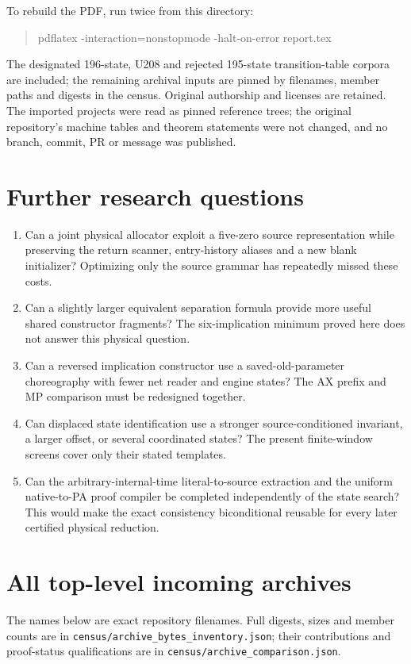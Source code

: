 \documentclass[11pt,letterpaper]{article}
\newcommand{\file}[1]{\texttt{\nolinkurl{#1}}}
\begin{document}
To rebuild the PDF, run twice from this directory:
\begin{quote}\small\ttfamily
pdflatex -interaction=nonstopmode -halt-on-error report.tex
\end{quote}
The designated 196-state, U208 and rejected 195-state transition-table
corpora are included; the remaining archival inputs are pinned by filenames,
member paths and digests in the census. Original authorship and
licenses are retained. The imported projects were read as pinned reference
trees; the original repository's machine tables and theorem statements were
not changed, and no branch, commit, PR or message was published.

\section{Further research questions}

\begin{enumerate}
\item Can a joint physical allocator exploit a five-zero source representation
while preserving the return scanner, entry-history aliases and a new blank
initializer? Optimizing only the source grammar has repeatedly missed these
costs.
\item Can a slightly larger equivalent separation formula provide more useful
shared constructor fragments? The six-implication minimum proved here does
not answer this physical question.
\item Can a reversed implication constructor use a saved-old-parameter
choreography with fewer net reader and engine states? The AX prefix and MP
comparison must be redesigned together.
\item Can displaced state identification use a stronger source-conditioned
invariant, a larger offset, or several coordinated states? The present
finite-window screens cover only their stated templates.
\item Can the arbitrary-internal-time literal-to-source extraction and the
uniform native-to-PA proof compiler be completed independently of the state
search? This would make the exact consistency biconditional reusable for
every later certified physical reduction.
\end{enumerate}

\appendix
\section{All top-level incoming archives}
\label{sec:allarchives}
The names below are exact repository filenames. Full digests, sizes and
member counts are in \file{census/archive_bytes_inventory.json}; their
contributions and proof-status qualifications are in
\file{census/archive_comparison.json}.
\end{document}
